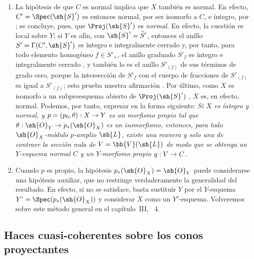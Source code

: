 \documentclass[oneside,10pt]{amsart}
\makeatletter
\newcommand{\ega@arrow}[2]{\mathchoice{#1}{#2}{#2}{#2}}
\renewcommand{\to}{\ega@arrow{\longrightarrow}{\rightarrow}}
\let\EGAOriginalLabel\label
\renewcommand{\label}[1]{\phantomsection\EGAOriginalLabel{#1}}
\makeatother
\begin{document}
\begin{remark}[8.11.8]
\label{II.8.11.8}
\begin{enumerate}
    \item[\rm{(i)}] La hipótesis de que $C$ es normal implica que $X$ también es normal.
        En efecto, $C'=\Spec(\sh{S}')$ es entonces normal, por ser isomorfo a $C$, e íntegro, por ;
        se concluye, pues, que $\Proj(\sh{S}')$ es \emph{normal}.
        En efecto, la cuestión es local sobre $Y$;
        si $Y$ es afín, con $\sh{S}'=\widetilde S'$, entonces el anillo $S'=\Gamma(C',\sh{S}')$ es íntegro e integralmente cerrado  y, por tanto, para todo elemento homogéneo $f\in S'_+$, el anillo graduado $S'_f$ es íntegro e integralmente cerrado \cite[t.~I, p.~257 y 261]{I-13}, y también lo es el anillo $S'_{(f)}$ de sus términos de grado cero, porque la intersección de $S'_f$ con el cuerpo de fracciones de $S'_{(f)}$ es igual a $S'_{(f)}$;
        esto prueba nuestra afirmación .
        Por último, como $X$ es isomorfo a un subpreesquema abierto de $\Proj(\sh{S}')$ , $X$ es, en efecto, normal.
        Podemos, por tanto, expresar  en la forma siguiente:
        \emph{Si $X$ es íntegro y normal, y $p=(p_0,\theta):X\to Y$ es un morfismo propio tal que $\theta:\sh{O}_Y\to p_*(\sh{O}_X)$ es un isomorfismo, entonces, para todo $\sh{O}_X$-módulo $p$-amplio $\sh{L}$, existe una manera y solo una de contraer la sección nula de $V=\bb{V}(\sh{L})$ de modo que se obtenga un $Y$-esquema normal $C$ y un $Y$-morfismo propio $q:V\to C$.}
    \item[\rm{(ii)}] Cuando $p$ es propio, la hipótesis $p_*(\sh{O}_X)=\sh{O}_Y$ puede considerarse una hipótesis auxiliar, que no restringe verdaderamente la generalidad del resultado.
        En efecto, si no se satisface, basta sustituir $Y$ por el $Y$-esquema $Y'=\Spec(p_*(\sh{O}_X))$ y considerar $X$ como un $Y'$-esquema.
        Volveremos sobre este método general en el capítulo~III, \textsection~4.
\end{enumerate}
\end{remark}


\subsection{Haces cuasi-coherentes sobre los conos proyectantes}
\label{subsection:II.8.12}
\end{document}

